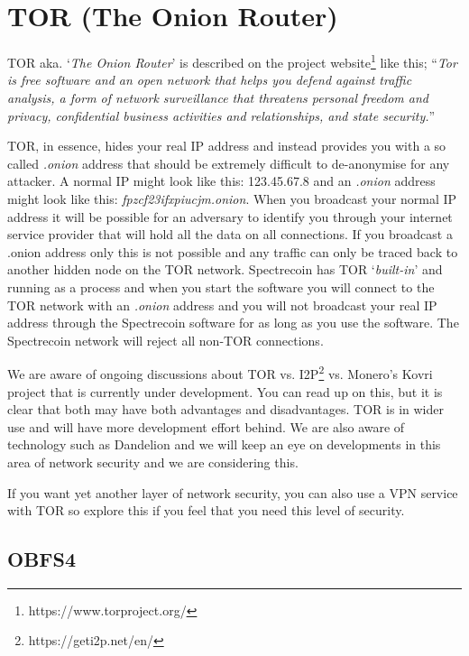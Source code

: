 \chapter{TOR (The Onion Router)}
TOR aka. ‘\textit{The Onion Router}’ is described on the project
website\footnote{https://www.torproject.org/ } like this; “\textit{Tor is 
free software and an open network that helps you defend against traffic 
analysis, a form of network surveillance that threatens personal freedom 
and privacy, confidential business activities and relationships, and 
state security.}” 



TOR, in essence, hides your real IP address and instead provides you with 
a so called \textit{.onion} address that should be extremely difficult to 
de-anonymise for any attacker. A normal IP might look like this: 123.45.67.8 
and an \textit{.onion} address might look like this: 
\textit{fpzcf23ifxpiucjm.onion}. When you broadcast your normal IP address 
it will be possible for an adversary to identify you through your internet 
service provider that will hold all the data on all connections. If you 
broadcast a .onion address only this is not possible and any traffic can 
only be traced back to another hidden node on the TOR network. Spectrecoin 
has TOR ‘\textit{built-in}’ and running as a process and when you start the 
software you will connect to the TOR network with an \textit{.onion} address 
and you will not broadcast your real IP address through the Spectrecoin 
software for as long as you use the software. The Spectrecoin network will 
reject all non-TOR connections. 



We are aware of ongoing discussions about TOR vs. I2P\footnote{https://geti2p.net/en/} 
vs. Monero’s Kovri project that is currently under development. You can 
read up on this, but it is clear that both may have both advantages and 
disadvantages. TOR is in wider use and will have more development effort 
behind. We are also aware of technology such as Dandelion and we will keep 
an eye on developments in this area of network security and we are 
considering this. 



If you want yet another layer of network security, you can also use a VPN 
service with TOR so explore this if you feel that you need this level of 
security. 


\section{OBFS4}
